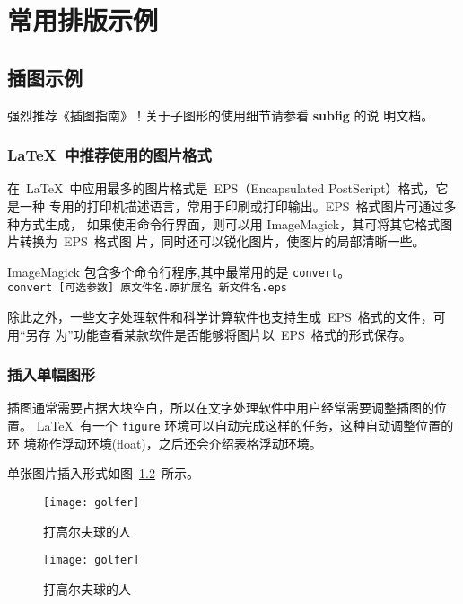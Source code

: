 \chapter{常用排版示例}
\label{cha:example}

\section{插图示例}
\label{sec:figure}

强烈推荐《\LaTeXe 插图指南》！关于子图形的使用细节请参看 \textbf{subfig} 的说
明文档。

\subsection{\LaTeX~中推荐使用的图片格式}

在~\LaTeX~中应用最多的图片格式是~EPS（Encapsulated PostScript）格式，它是一种
专用的打印机描述语言，常用于印刷或打印输出。EPS~格式图片可通过多种方式生成，
如果使用命令行界面，则可以用 ImageMagick，其可将其它格式图片转换为~EPS~格式图
片，同时还可以锐化图片，使图片的局部清晰一些。

ImageMagick 包含多个命令行程序,其中最常用的是 \texttt{convert}。\\
\verb|convert [可选参数] 原文件名.原扩展名 新文件名.eps|

除此之外，一些文字处理软件和科学计算软件也支持生成~EPS~格式的文件，可用“另存
为”功能查看某款软件是否能够将图片以~EPS~格式的形式保存。

\subsection{插入单幅图形}

插图通常需要占据大块空白，所以在文字处理软件中用户经常需要调整插图的位置。
\LaTeX~有一个 \texttt{figure} 环境可以自动完成这样的任务，这种自动调整位置的环
境称作浮动环境(float)，之后还会介绍表格浮动环境。

单张图片插入形式如图~\ref{golfer1}~所示。
\begin{figure}[htbp]
\centering
\texttt{[image: golfer]}
\caption{打高尔夫球的人}
\label{golfer1}
\end{figure}

\begin{code}
\begin{figure}[htbp]
\centering
\texttt{[image: golfer]}
\caption{打高尔夫球的人}
\label{golfer1}
\end{figure}
\end{code}

